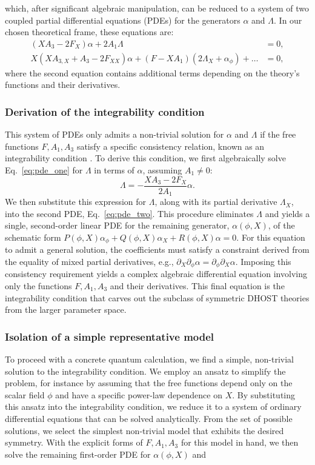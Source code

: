 \documentclass[twocolumn]{aastex631}
\begin{document}
which, after significant algebraic manipulation, can be reduced to a system of two coupled partial differential equations (PDEs) for the generators $\alpha$ and $\Lambda$. In our chosen theoretical frame, these equations are:\begin{align}\left(X A_3 - 2 F_X\right) \alpha + 2 A_1 \Lambda &= 0, \label{eq:pde_one} \\X \left(X A_{3,X} + A_3 - 2 F_{XX}\right) \alpha + \left(F - X A_1 \right) \left(2 \Lambda_X + \alpha_\phi \right) + \dots &= 0, \label{eq:pde_two}\end{align}where the second equation contains additional terms depending on the theory's functions and their derivatives.\subsubsection{Derivation of the integrability condition}This system of PDEs only admits a non-trivial solution for $\alpha$ and $\Lambda$ if the free functions $F, A_1, A_3$ satisfy a specific consistency relation, known as an integrability condition \citep{papachristou2019aspectsintegrabilitydifferentialsystems}. To derive this condition, we first algebraically solve Eq.~\eqref{eq:pde_one} for $\Lambda$ in terms of $\alpha$, assuming $A_1 \neq 0$:\begin{equation}\Lambda = - \frac{X A_3 - 2 F_X}{2 A_1} \alpha.\end{equation}We then substitute this expression for $\Lambda$, along with its partial derivative $\Lambda_X$, into the second PDE, Eq.~\eqref{eq:pde_two}. This procedure eliminates $\Lambda$ and yields a single, second-order linear PDE for the remaining generator, $\alpha(\phi, X)$, of the schematic form $P(\phi,X) \alpha_\phi + Q(\phi,X) \alpha_X + R(\phi,X) \alpha = 0$. For this equation to admit a general solution, the coefficients must satisfy a constraint derived from the equality of mixed partial derivatives, e.g., $\partial_X \partial_\phi \alpha = \partial_\phi \partial_X \alpha$. Imposing this consistency requirement yields a complex algebraic differential equation involving only the functions $F, A_1, A_3$ and their derivatives. This final equation is the integrability condition that carves out the subclass of symmetric DHOST theories from the larger parameter space.\subsubsection{Isolation of a simple representative model}To proceed with a concrete quantum calculation, we find a simple, non-trivial solution to the integrability condition. We employ an ansatz to simplify the problem, for instance by assuming that the free functions depend only on the scalar field $\phi$ and have a specific power-law dependence on $X$. By substituting this ansatz into the integrability condition, we reduce it to a system of ordinary differential equations that can be solved analytically. From the set of possible solutions, we select the simplest non-trivial model that exhibits the desired symmetry. With the explicit forms of $F, A_1, A_3$ for this model in hand, we then solve the remaining first-order PDE for $\alpha(\phi, X)$ and 
\end{document}
